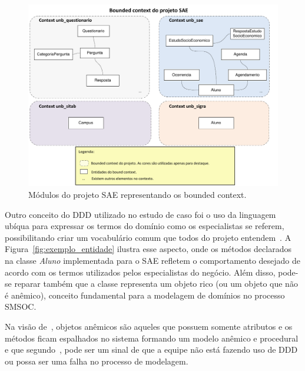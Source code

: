 \begin{figure}[htb]
\centering
\includegraphics[scale=0.91]{img/processo/bound_context.pdf}
\caption{Módulos do projeto SAE representando os bounded context.}
\label{fig:bound_context}
\end{figure}

Outro conceito do \acrshort{DDD} utilizado
no estudo de caso foi
o uso da linguagem ubíqua para
expressar os termos 
do domínio como os especialistas se referem,
possibilitando 
criar um vocabulário comum que todos do projeto entendem~\cite{evans2004domain}. 
A Figura~\ref{fig:exemplo_entidade}
ilustra esse aspecto, 
onde os métodos declarados na classe \emph{Aluno}
implementada para o \acrshort{SAE}
refletem o comportamento desejado
de acordo com os termos utilizados 
pelos especialistas do negócio. 
Além disso, pode-se reparar 
também que a classe representa
um objeto rico (ou um objeto que não é anêmico),
conceito fundamental para 
a modelagem de domínios no processo \acrshort{SMSOC}. 

Na visão de~\cite{balasubramanian2006developing},
objetos anêmicos são aqueles que possuem somente atributos
e os métodos ficam espalhados no sistema
formando um modelo anêmico e procedural e
que segundo~\cite{evans2004domain},
pode ser um sinal de que a equipe 
não está fazendo uso de \acrshort{DDD} ou 
possa ser uma falha no
processo de modelagem. 


